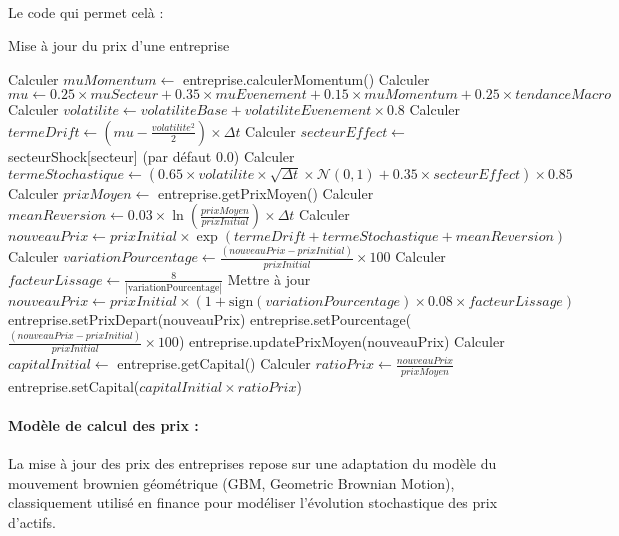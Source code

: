 \paragraph{}Le code qui permet celà : 
\begin{algorithm}
\caption{Mise à jour du prix d'une entreprise}
\label{alg:update_price}
\begin{algorithmic}[1]
\STATE Calculer $muMomentum \gets$ entreprise.calculerMomentum()
\STATE Calculer $mu \gets 0.25 \times muSecteur + 0.35 \times muEvenement + 0.15 \times muMomentum + 0.25 \times tendanceMacro$
\STATE Calculer $volatilite \gets volatiliteBase + volatiliteEvenement \times 0.8$
\STATE Calculer $termeDrift \gets (mu - \frac{volatilite^2}{2}) \times \Delta t$
\STATE Calculer $secteurEffect \gets$ secteurShock[secteur] (par défaut 0.0)
\STATE Calculer $termeStochastique \gets (0.65 \times volatilite \times \sqrt{\Delta t} \times \mathcal{N}(0,1) + 0.35 \times secteurEffect) \times 0.85$
\STATE Calculer $prixMoyen \gets$ entreprise.getPrixMoyen()
\STATE Calculer $meanReversion \gets 0.03 \times \ln\left(\frac{prixMoyen}{prixInitial}\right) \times \Delta t$
\STATE Calculer $nouveauPrix \gets prixInitial \times \exp(termeDrift + termeStochastique + meanReversion)$
\STATE Calculer $variationPourcentage \gets \frac{(nouveauPrix - prixInitial)}{prixInitial} \times 100$
    \STATE Calculer $facteurLissage \gets \frac{8}{|\text{variationPourcentage}|}$
    \STATE Mettre à jour $nouveauPrix \gets prixInitial \times (1 + \text{sign}(variationPourcentage) \times 0.08 \times facteurLissage)$
\ENDIF
\STATE entreprise.setPrixDepart(nouveauPrix)
\STATE entreprise.setPourcentage($\frac{(nouveauPrix - prixInitial)}{prixInitial} \times 100$)
\STATE entreprise.updatePrixMoyen(nouveauPrix)
\STATE Calculer $capitalInitial \gets$ entreprise.getCapital()
\STATE Calculer $ratioPrix \gets \frac{nouveauPrix}{prixMoyen}$
\STATE entreprise.setCapital($capitalInitial \times ratioPrix$)
\end{algorithmic}
\end{algorithm}



\vspace{0.5cm}

\paragraph{Modèle de calcul des prix :}

La mise à jour des prix des entreprises repose sur une adaptation du modèle du mouvement brownien géométrique (GBM, Geometric Brownian Motion), classiquement utilisé en finance pour modéliser l'évolution stochastique des prix d'actifs.

